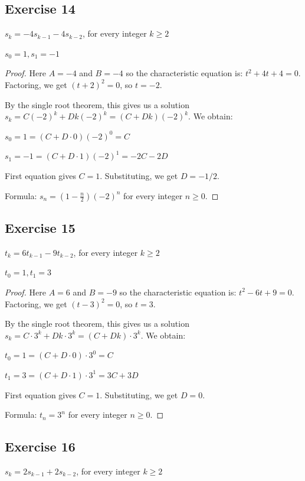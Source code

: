 \documentclass[14pt]{extarticle}
\begin{document}
\subsection{Exercise 14}
\(s_k = -4s_{k-1} - 4s_{k-2}\), for every integer \(k \geq 2\)

\(s_0 = 1, s_1 = -1\)

\begin{proof}
Here $A = -4$ and $B = -4$ so the characteristic equation is: \(t^2 + 4t + 4 = 0\). 
Factoring, we get \((t + 2)^2 = 0\), so $t = -2$.

By the single root theorem, this gives us a solution \(s_k = C(-2)^k + Dk(-2)^k = (C + Dk)(-2)^k\). We obtain:

\(s_0 = 1 = (C + D \cdot 0)(-2)^0 = C\)

\(s_1 = -1 = (C + D \cdot 1)(-2)^1 = -2C - 2D\)

First equation gives $C = 1$. Substituting, we get $D = -1/2$.

Formula: \(s_n = (1 - \frac{n}{2})(-2)^n\) for every integer \(n \geq 0\).
\end{proof}

\subsection{Exercise 15}
\(t_k = 6t_{k-1} - 9t_{k-2}\), for every integer \(k \geq 2\)

\(t_0 = 1, t_1 = 3\)

\begin{proof}
Here $A = 6$ and $B = -9$ so the characteristic equation is: \(t^2 - 6t + 9 = 0\). 
Factoring, we get \((t - 3)^2 = 0\), so $t = 3$.

By the single root theorem, this gives us a solution \(s_k = C \cdot 3^k + Dk \cdot 3^k = (C + Dk) \cdot 3^k\). 
We obtain:

\(t_0 = 1 = (C + D \cdot 0) \cdot 3^0 = C\)

\(t_1 = 3 = (C + D \cdot 1) \cdot 3^1 = 3C + 3D\)

First equation gives $C = 1$. Substituting, we get $D = 0$.

Formula: \(t_n = 3^n\) for every integer \(n \geq 0\).
\end{proof}

\subsection{Exercise 16}
\(s_k = 2s_{k-1} + 2s_{k-2}\), for every integer \(k \geq 2\)
\end{document}
